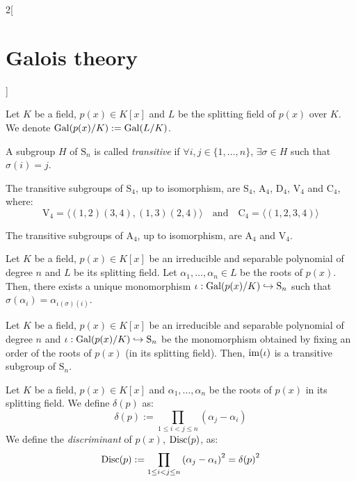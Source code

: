 \documentclass[../../../main_math.tex]{subfiles}
\begin{document}
\begin{multicols}{2}[\section{Galois theory}]
\begin{center}
\begin{minipage}{\linewidth}
    \end{minipage}
  \end{center}
  \begin{definition}
    Let $K$ be a field, $p(x)\in K[x]$ and $L$ be the splitting field of $p(x)$ over $K$. We denote $\operatorname{Gal}(p(x)/K):=\operatorname{Gal}(L/K)$.
  \end{definition}
  \begin{definition}
    A subgroup $H$ of $\text{S}_n$ is called \emph{transitive} if $\forall i,j\in\{1,\ldots,n\}$, $\exists \sigma\in H$ such that $\sigma(i)=j$.
  \end{definition}
  \begin{lemma}
    The transitive subgroups of $\text{S}_4$, up to isomorphism, are $\text{S}_4$, $\text{A}_4$, $\text{D}_4$, $\text{V}_4$ and $\text{C}_4$, where:
    $$\text{V}_4=\langle (1,2)(3,4),(1,3)(2,4)\rangle\quad\text{and}\quad \text{C}_4=\langle(1,2,3,4)\rangle$$
  \end{lemma}
  \begin{corollary}
    The transitive subgroups of $\text{A}_4$, up to isomorphism, are $\text{A}_4$ and $\text{V}_4$.
  \end{corollary}
  \begin{lemma}
    Let $K$ be a field, $p(x)\in K[x]$ be an irreducible and separable polynomial of degree $n$ and $L$ be its splitting field. Let $\alpha_1,\ldots,\alpha_n\in L$ be the roots of $p(x)$. Then, there exists a unique monomorphism $\iota: \operatorname{Gal}(p(x)/K)\hookrightarrow \text{S}_n$ such that $\sigma(\alpha_i)=\alpha_{\iota(\sigma)(i)}$.
  \end{lemma}
  \begin{lemma}
    Let $K$ be a field, $p(x)\in K[x]$ be an irreducible and separable polynomial of degree $n$ and $\iota: \operatorname{Gal}(p(x)/K)\hookrightarrow \text{S}_n$ be the monomorphism obtained by fixing an order of the roots of $p(x)$ (in its splitting field). Then, $\operatorname{im}(\iota)$ is a transitive subgroup of $\text{S}_n$.
  \end{lemma}
  \begin{definition}
    Let $K$ be a field, $p(x)\in K[x]$ and $\alpha_1,\ldots,\alpha_n$ be the roots of $p(x)$ in its splitting field. We define $\delta(p)$ as: $$\delta(p):=\prod_{1\leq i<j\leq n}(\alpha_j-\alpha_i)$$
    We define the \emph{discriminant} of $p(x)$, $\operatorname{Disc}(p)$, as: $$\operatorname{Disc}(p):=\prod_{1\leq i<j\leq n}{(\alpha_j-\alpha_i)}^2={\delta(p)}^2$$
  \end{definition}

\end{multicols}
\end{document}
